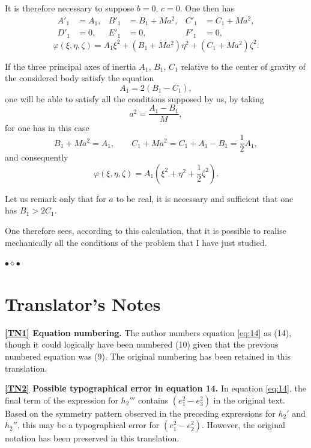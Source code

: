 \documentclass{article}
\begin{document}
It is therefore necessary to suppose $b = 0$, $c = 0$. One then has
\begin{align*}
A'_1 &= A_1, & B'_1 &= B_1 + Ma^2, & C'_1 &= C_1 + Ma^2, \\
D'_1 &= 0, & E'_1 &= 0, & F'_1 &= 0,
\end{align*}
\[
\varphi(\xi, \eta, \zeta) = A_1\xi^2 + (B_1 + Ma^2)\eta^2 + (C_1 + Ma^2)\zeta^2.
\]

If the three principal axes of inertia $A_1$, $B_1$, $C_1$ relative to the center of gravity of the considered body satisfy the equation
\[
A_1 = 2(B_1 - C_1),
\]
one will be able to satisfy all the conditions supposed by us, by taking
\[
a^2 = \frac{A_1 - B_1}{M},
\]
for one has in this case
\[
B_1 + Ma^2 = A_1, \qquad C_1 + Ma^2 = C_1 + A_1 - B_1 = \frac{1}{2}A_1,
\]
and consequently
\[
\varphi(\xi, \eta, \zeta) = A_1\left(\xi^2 + \eta^2 + \frac{1}{2}\zeta^2\right).
\]

Let us remark only that for $a$ to be real, it is necessary and sufficient that one has $B_1 > 2C_1$.

One therefore sees, according to this calculation, that it is possible to realise mechanically all the conditions of the problem that I have just studied.

\vspace{1in}
\begin{center}
\raisebox{0.5ex}{\rule{1in}{0.5pt}}\quad$\bullet$\quad$\diamond$\quad$\bullet$\quad\raisebox{0.5ex}{\rule{1in}{0.5pt}}
\end{center}

\newpage
\section*{Translator's Notes}

\noindent\hypertarget{TN1}{}\textbf{\hyperlink{TN1-ref}{[TN1]} Equation numbering.} The author numbers equation \eqref{eq:14} as (14), though it could logically have been numbered (10) given that the previous numbered equation was (9). The original numbering has been retained in this translation.

\noindent\hypertarget{TN2}{}\textbf{\hyperlink{TN2-ref}{[TN2]} Possible typographical error in equation 14.} In equation \eqref{eq:14}, the final term of the expression for $h_2'''$ contains $(e_1^2 - e_3^2)$ in the original text. Based on the symmetry pattern observed in the preceding expressions for $h_2'$ and $h_2''$, this may be a typographical error for $(e_1^2 - e_2^2)$. However, the original notation has been preserved in this translation.
\end{document}
